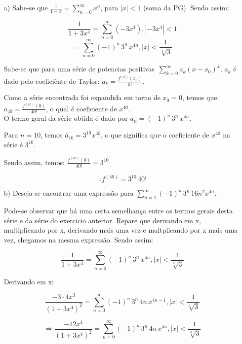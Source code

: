 \documentclass[12pt,a4paper]{article}
\begin{document}
\begin{itemize}
    \item[a)] Sabe-se que $ \displaystyle\frac{1}{1-x} = \displaystyle\sum_{n=0}^\infty x^n $, para $|x|<1$ (soma da PG). Sendo assim:
    
    $$\frac{1}{1 + 3x^4} = \sum_{n=0}^\infty (-3 x^4), |-3x^4| < 1$$
    $$ = \sum_{n=0}^\infty (-1)^n  \, 3^n \, x^{4n}, |x| < \frac{1}{\sqrt[4]{3}} $$
    
    
    Sabe-se que para uma série de potencias positivas $ \, \displaystyle\sum_{k=0}^\infty a_k (x-x_0)^k $, $a_k$ é dado pelo coeficiênte de Taylor: $a_k = \displaystyle\frac{f^{(k)}(x_0)}{k!}$.
    
    Como a série encontrada foi expandida em torno de $x_0 = 0$, temos que: $a_{40} = \displaystyle\frac{f^{(40)}(0)}{40!}$, o qual é coeficiente de $x^{40}$. \\
    
    O termo geral da série obtida é dado por $ \bar{a}_n = (-1)^n  \, 3^n \, x^{4n}$.
    
    Para $n=10$, temos $\bar{a}_{10} = 3^{10} x^{40}$, o que significa que o coeficiente de $x^{40}$ na série é $3^{10}$.
    
    Sendo assim, temos: $ \displaystyle\frac{f^{(40)}(0)}{40!} = 3^{10} $
    
    $$ \therefore f^{(40)} = 3^{10} \, 40! $$


    \item[b)] Deseja-se encontrar uma expressão para $\displaystyle\sum_{n=1}^\infty (-1)^n \, 3^n \, 16 n^2 x^{4n}$.
    
     Pode-se observar que há uma certa semelhança entre os termos gerais desta série e da série do exercicio anterior. Repare que derivando em x, multiplicando por x, derivando mais uma vez e multplicando por x mais uma vez, chegamos na mesma expressão. Sendo assim:
     
     $$\frac{1}{1 + 3x^4} =  \sum_{n=0}^\infty (-1)^n  \, 3^n \, x^{4n}, |x| < \frac{1}{\sqrt[4]{3}} $$
     
     Derivando em x:
     
     $$\frac{-3 \cdot 4 x^3}{(1 + 3x^4)^2} =  \sum_{n=0}^\infty (-1)^n  \, 3^n \, 4 n \, x^{4n-1}, |x| < \frac{1}{\sqrt[4]{3}} $$
     
     $$ \Rightarrow \frac{-12 x^4}{(1 + 3x^4)^2} =  \sum_{n=0}^\infty (-1)^n  \, 3^n \, 4 n \, x^{4n}, |x| < \frac{1}{\sqrt[4]{3}} $$
     

\end{itemize}
\end{document}
